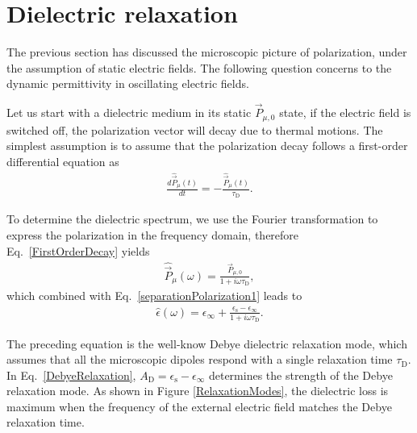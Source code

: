 \section{Dielectric relaxation}\label{DRTheory}


The previous section has discussed the microscopic picture of polarization, under the assumption of static electric fields. The following question concerns to the dynamic permittivity in oscillating electric fields.

Let us start with a dielectric medium in its static $\vec{P}_{\mu,0}$ state, if the electric field is switched off, the polarization vector will decay due to thermal motions. The simplest assumption is to assume that the polarization decay follows a first-order differential equation as
\begin{eqnarray}
\frac{d \hat{\vec{P}}_\mu (t)}{d t } = - \frac{\hat{\vec{P}}_\mu (t)}{\tau_\text{D}}.
\label{FirstOrderDecay}
\end{eqnarray}




To determine the dielectric spectrum, we use the Fourier transformation to express the polarization in the frequency domain, therefore Eq.\ \ref{FirstOrderDecay} yields 
\begin{eqnarray}
\hat{\vec{P}}_\mu (\omega) =  \frac{\vec{P}_{\mu,0}}{1 + i \omega \tau_\text{D}},
\label{FouriertranformP}
\end{eqnarray}
\noindent which combined with Eq.\ \ref{separationPolarization1} leads to 
\begin{eqnarray}
\hat{\epsilon} (\omega) =  \epsilon_\infty + \frac{ \epsilon_\text{s} - \epsilon_\infty }{1 + i \omega \tau_\text{D}}.
\label{DebyeRelaxation}
\end{eqnarray}







The preceding equation is the well-know Debye dielectric relaxation mode,\!\cite{DebyeBook1929,Debye1934} which assumes that all the microscopic dipoles respond with a single relaxation time $\tau_\text{D}$. In Eq.\ \ref{DebyeRelaxation}, $A_\text{D} = \epsilon_\text{s} - \epsilon_\infty$ determines the strength of the Debye relaxation mode. As shown in Figure \ref{RelaxationModes}, the dielectric loss is maximum when the frequency of the external electric field matches the Debye relaxation time. 





